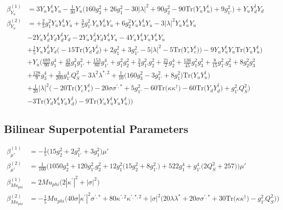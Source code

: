 {\begin{align}
\beta_{Y_u}^{(1)} & =  
3 {Y_u  Y_{u}^{\dagger}  Y_u}  -\frac{1}{30} Y_u \Big(160 g_{3}^{2}  + 26 g_{1}^{2}  -30 |\lambda|^2  + 90 g_{2}^{2}  -90 \mbox{Tr}\Big({Y_u  Y_{u}^{\dagger}}\Big)  + 9 g_{1'}^{2} \Big) + {Y_u  Y_{d}^{\dagger}  Y_d}\\ 
\beta_{Y_u}^{(2)} & =  
+\frac{2}{5} g_{1}^{2} {Y_u  Y_{u}^{\dagger}  Y_u} +\frac{3}{5} g_{1'}^{2} {Y_u  Y_{u}^{\dagger}  Y_u} +6 g_{2}^{2} {Y_u  Y_{u}^{\dagger}  Y_u} -3 |\lambda|^2 {Y_u  Y_{u}^{\dagger}  Y_u} \nonumber \\ 
 &-2 {Y_u  Y_{d}^{\dagger}  Y_d  Y_{d}^{\dagger}  Y_d} -2 {Y_u  Y_{d}^{\dagger}  Y_d  Y_{u}^{\dagger}  Y_u} -4 {Y_u  Y_{u}^{\dagger}  Y_u  Y_{u}^{\dagger}  Y_u} \nonumber \\ 
 &+\frac{1}{5} {Y_u  Y_{d}^{\dagger}  Y_d} \Big(-15 \mbox{Tr}\Big({Y_d  Y_{d}^{\dagger}}\Big)  + 2 g_{1}^{2}  + 3 g_{1'}^{2}  -5 |\lambda|^2  -5 \mbox{Tr}\Big({Y_e  Y_{e}^{\dagger}}\Big) \Big)-9 {Y_u  Y_{u}^{\dagger}  Y_u} \mbox{Tr}\Big({Y_u  Y_{u}^{\dagger}}\Big) \nonumber \\ 
 &+Y_u \Big(\frac{689}{90} g_{1}^{4} +\frac{43}{60} g_{1}^{2} g_{1'}^{2} +\frac{153}{80} g_{1'}^{4} +g_{1}^{2} g_{2}^{2} +\frac{3}{4} g_{1'}^{2} g_{2}^{2} +\frac{21}{2} g_{2}^{4} +\frac{136}{45} g_{1}^{2} g_{3}^{2} +\frac{8}{15} g_{1'}^{2} g_{3}^{2} +8 g_{2}^{2} g_{3}^{2} \nonumber \\ 
 &+\frac{128}{9} g_{3}^{4} +\frac{3}{200} g_{1'}^{4} Q_{S}^{2} -3 \lambda^{2} \lambda^{*,2} +\frac{1}{10} \Big(160 g_{3}^{2}  -3 g_{1'}^{2}  + 8 g_{1}^{2} \Big)\mbox{Tr}\Big({Y_u  Y_{u}^{\dagger}}\Big) \nonumber \\ 
 &+\frac{1}{20} |\lambda|^2 \Big(-20 \mbox{Tr}\Big({Y_e  Y_{e}^{\dagger}}\Big)  -20 \sigma \sigma^{\prime,*}  + 5 g_{1'}^{2}  -60 \mbox{Tr}\Big({\kappa  \kappa^{\dagger}}\Big)  -60 \mbox{Tr}\Big({Y_d  Y_{d}^{\dagger}}\Big)  + g_{1'}^{2} Q_{S}^{2} \Big)\nonumber \\ 
 &-3 \mbox{Tr}\Big({Y_d  Y_{u}^{\dagger}  Y_u  Y_{d}^{\dagger}}\Big) -9 \mbox{Tr}\Big({Y_u  Y_{u}^{\dagger}  Y_u  Y_{u}^{\dagger}}\Big) \Big)
\end{align}} 
\subsection{Bilinear Superpotential Parameters}
{\allowdisplaybreaks  \begin{align} 
\beta_{\mu'}^{(1)} & =  
-\frac{1}{5} \Big(15 g_{2}^{2}  + 2 g_{1'}^{2}  + 3 g_{1}^{2} \Big)\mu' \\ 
\beta_{\mu'}^{(2)} & =  
\frac{1}{100} \Big(1050 g_{2}^{4}  + 120 g_{1'}^{2} g_{2}^{2}  + 12 g_{1}^{2} \Big(15 g_{2}^{2}  + 8 g_{1'}^{2} \Big) + 522 g_{1}^{4}  + g_{1'}^{4} \Big(2 Q_{S}^{2}  + 257\Big)\Big)\mu' \\ 
\beta_{Mu_{phi}}^{(1)} & =  
2 Mu_{phi} \Big(2 |\kappa^\prime|^2  + |\sigma|^2\Big)\\ 
\beta_{Mu_{phi}}^{(2)} & =  
-\frac{1}{5} Mu_{phi} \Big(40 \sigma |\kappa^\prime|^2 \sigma^{\prime,*}  + 80 \kappa^{\prime,2} \kappa^{\prime,*,2}  + |\sigma|^2 \Big(20 \lambda \lambda^*  + 20 \sigma \sigma^{\prime,*}  + 30 \mbox{Tr}\Big({\kappa  \kappa^{\dagger}}\Big)  - g_{1'}^{2} Q_{S}^{2} \Big)\Big)
\end{align}} 
